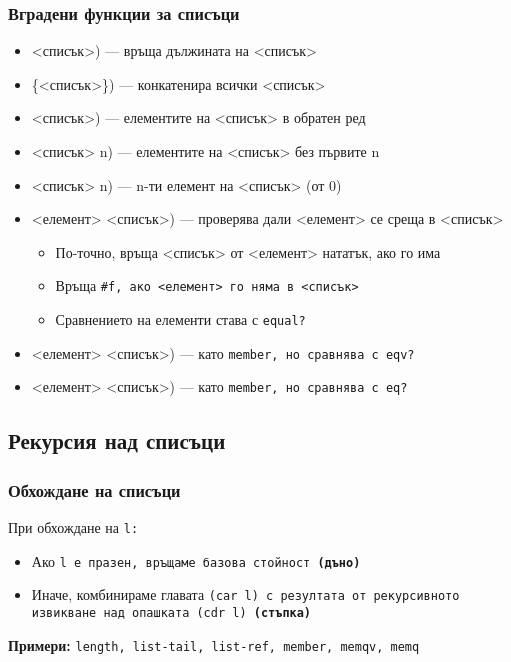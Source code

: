 \documentclass{beamer}
\begin{document}
\begin{frame}
  \frametitle{Вградени функции за списъци}
  \small
  \begin{itemize}[<+->]
  \item {}<списък>\tta) --- връща дължината на <списък>
  \item {}\{<списък>\}\tta) --- конкатенира всички <списък>
  \item {}<списък>\tta) --- елементите на <списък> в обратен ред
  \item {}<списък> n\tta) --- елементите на <списък> без първите n
  \item {}<списък> n\tta) --- n-ти елемент на <списък> (от 0)
  \item {}<елемент> <списък>\tta) --- проверява дали <елемент> се среща в <списък>
    \begin{itemize}
    \item По-точно, връща <списък> от <елемент> нататък, ако го има
    \item Връща \tt{\#f}, ако <елемент> го няма в <списък>
    \item Сравнението на елементи става с \tt{equal?}
    \end{itemize}
  \item {}<елемент> <списък>\tta) --- като \tt{member}, но сравнява с \tt{eqv?}
  \item {}<елемент> <списък>\tta) --- като \tt{member}, но сравнява с \tt{eq?}
  \end{itemize}
\end{frame}

\subsection{Рекурсия над списъци}

\begin{frame}
  \frametitle{Обхождане на списъци}

  При обхождане на \tt l:
  \begin{itemize}
  \item Ако \tt l е празен, връщаме базова стойност \textbf{(дъно)}
  \item Иначе, комбинираме главата \tt{(car l)} с резултата от рекурсивното извикване над опашката \tt{(cdr l)} \textbf{(стъпка)}
  \end{itemize}
  \pause
  \vspace{2em}
  \textbf{Примери:} \tt{length}, \tt{list-tail}, \tt{list-ref}, \tt{member}, \tt{memqv}, \tt{memq}
\end{frame}
\end{document}
